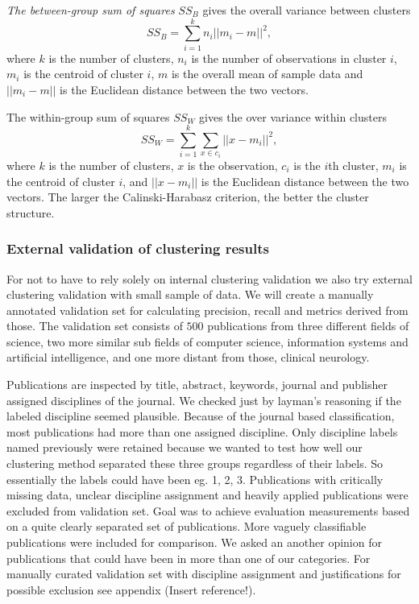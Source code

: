 \emph{The between-group sum of squares} $SS_B$ gives the overall variance
between clusters
\begin{equation}
 SS_B = \sum_{i=1}^k n_i ||m_i-m||^2,
\end{equation}
where $k$ is the number of clusters, $n_i$ is the number of 
observations in cluster $i$, $m_i$ is the centroid of cluster $i$, 
$m$ is the overall mean of sample data and $||m_i-m||$ is the 
Euclidean distance between the two vectors.

The within-group sum of squares $SS_W$ gives the over variance 
within clusters
\begin{equation}
 SS_W = \sum_{i=1}^k \sum_{x\in c_i} ||x-m_i||^2,
\end{equation}
where $k$ is the number of clusters, $x$ is the observation, 
$c_i$ is the $i$th cluster, $m_i$ is the centroid of cluster $i$, and 
$||x-m_i||$ is the Euclidean distance between the two vectors.
The larger the Calinski-Harabasz criterion, the better the 
cluster structure.


\subsubsection{External validation of clustering results}
For not to have to rely solely on internal clustering validation we
also try external clustering validation with small sample of data.
We will create a manually annotated validation set for calculating
precision, recall and metrics derived from those.
The validation
set consists of $500$ publications from three different fields of
science, two more similar sub fields of computer science, 
information systems and artificial intelligence, and one more
distant from those, clinical neurology.

Publications are inspected by title, abstract, keywords, journal
and publisher assigned disciplines of the journal. We checked 
just by layman's reasoning if the labeled discipline seemed 
plausible. Because of the journal based 
classification, most publications had more than one 
assigned discipline. Only discipline labels named 
previously were retained because we wanted to test 
how well our clustering method separated these three 
groups regardless of their labels. So essentially the 
labels could have been eg. 1, 2, 3. Publications
with critically missing data, unclear discipline assignment and
heavily applied publications were excluded from validation set.
Goal was to achieve evaluation measurements based on a quite 
clearly separated set of publications. More vaguely classifiable
publications were included for comparison. We asked an another 
opinion for publications that could have been in more 
than one of our categories. For manually curated validation set 
with discipline assignment and justifications for
possible exclusion see appendix (Insert reference!).

